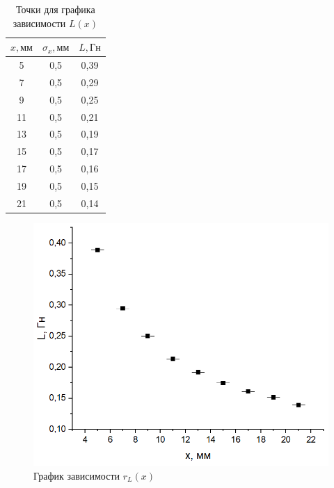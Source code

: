 \documentclass[a4paper, fontsize = 14pt]{article}
\begin{document}
\begin{table}[hbt]
\centering
\begin{tabular}{|c|c|c|}
\hline
\textbf{$x, мм$} & \textbf{$\sigma_x, мм$} & \textbf{$L, Гн$} \\ \hline
5                & 0,5                     & 0,39             \\ \hline
7                & 0,5                     & 0,29             \\ \hline
9                & 0,5                     & 0,25             \\ \hline
11               & 0,5                     & 0,21             \\ \hline
13               & 0,5                     & 0,19             \\ \hline
15               & 0,5                     & 0,17             \\ \hline
17               & 0,5                     & 0,16             \\ \hline
19               & 0,5                     & 0,15             \\ \hline
21               & 0,5                     & 0,14             \\ \hline
\end{tabular}
\caption{Точки для графика зависимости $L(x)$}
\end{table}

\begin{figure}
	\centering
	\includegraphics[scale=0.7]{lab48ris4.png}
	\caption{График зависимости $r_L(x)$}
\end{figure}
\end{document}
